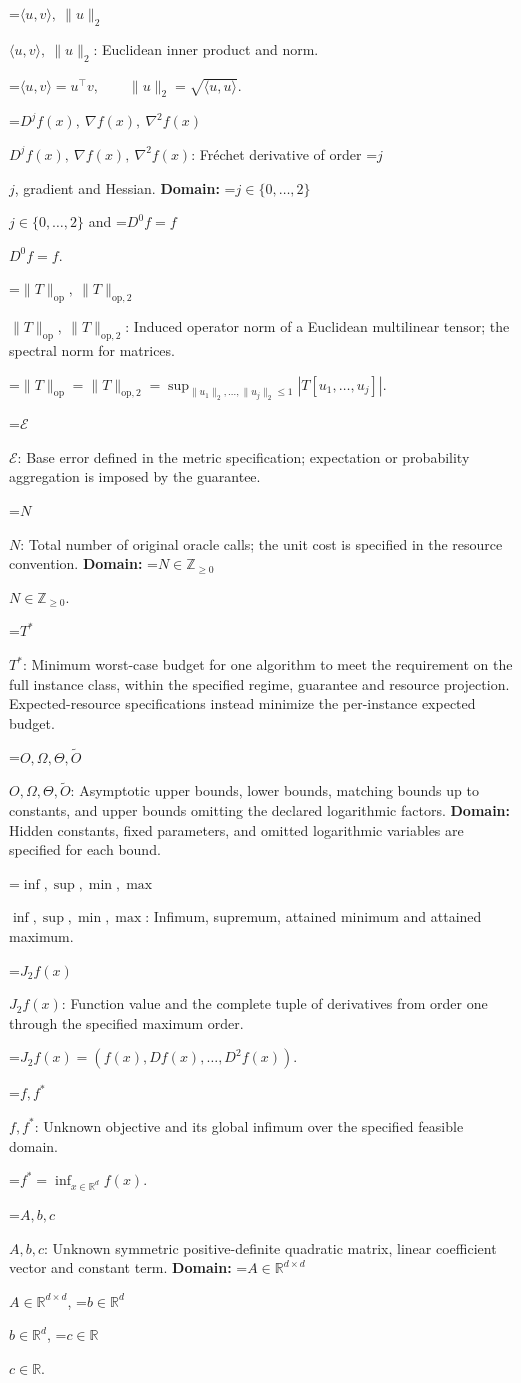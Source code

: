 \documentclass[10pt,a4paper]{article}
\newcommand{\AtlasMath}[1]{\par\begingroup\centering\setbox0=\hbox{$\displaystyle #1$}\ifdim\wd0>1.4\linewidth\typeout{ATLAS WIDE FORMULA: \the\wd0}\fi\ifdim\wd0>\linewidth\resizebox{\linewidth}{!}{\box0}\else\box0\fi\par\endgroup}
\newcommand{\AtlasInlineMath}[1]{\begingroup\setbox0=\hbox{$#1$}\ifdim\wd0>.4\linewidth\endgroup\AtlasMath{#1}\else\endgroup$#1$\fi}
\begin{document}
\AtlasInlineMath{\langle u,v\rangle,\ \|u\|_2}: Euclidean inner product and norm.


\AtlasMath{\langle u,v\rangle=u^\top v,\qquad\|u\|_2=\sqrt{\langle u,u\rangle}.}


\AtlasInlineMath{D^jf(x),\ \nabla f(x),\ \nabla^2f(x)}: Fréchet derivative of order \AtlasInlineMath{j}, gradient and Hessian. \textbf{Domain:} \AtlasInlineMath{j\in\{0,\ldots,2\}} and \AtlasInlineMath{D^0f=f}.

\AtlasInlineMath{\|T\|_{\mathrm{op}},\ \|T\|_{\mathrm{op},2}}: Induced operator norm of a Euclidean multilinear tensor; the spectral norm for matrices.


\AtlasMath{\|T\|_{\mathrm{op}}=\|T\|_{\mathrm{op},2}=\sup_{\|u_1\|_2,\ldots,\|u_j\|_2\le1}|T[u_1,\ldots,u_j]|.}


\AtlasInlineMath{\mathcal{E}}: Base error defined in the metric specification; expectation or probability aggregation is imposed by the guarantee.

\AtlasInlineMath{N}: Total number of original oracle calls; the unit cost is specified in the resource convention. \textbf{Domain:} \AtlasInlineMath{N\in\mathbb{Z}_{\ge0}}.

\AtlasInlineMath{T^*}: Minimum worst-case budget for one algorithm to meet the requirement on the full instance class, within the specified regime, guarantee and resource projection. Expected-resource specifications instead minimize the per-instance expected budget.

\AtlasInlineMath{O,\Omega,\Theta,\widetilde{O}}: Asymptotic upper bounds, lower bounds, matching bounds up to constants, and upper bounds omitting the declared logarithmic factors. \textbf{Domain:} Hidden constants, fixed parameters, and omitted logarithmic variables are specified for each bound.

\AtlasInlineMath{\inf,\sup,\min,\max}: Infimum, supremum, attained minimum and attained maximum.

\AtlasInlineMath{J_{2}f(x)}: Function value and the complete tuple of derivatives from order one through the specified maximum order.


\AtlasMath{J_{2}f(x)=(f(x),Df(x),\ldots,D^{2}f(x)).}


\AtlasInlineMath{f,f^*}: Unknown objective and its global infimum over the specified feasible domain.


\AtlasMath{f^*=\inf_{x\in \mathbb{R}^d}f(x).}


\AtlasInlineMath{A,b,c}: Unknown symmetric positive-definite quadratic matrix, linear coefficient vector and constant term. \textbf{Domain:} \AtlasInlineMath{A\in\mathbb{R}^{d\times d}}, \AtlasInlineMath{b\in\mathbb{R}^d}, \AtlasInlineMath{c\in\mathbb{R}}.
\end{document}

